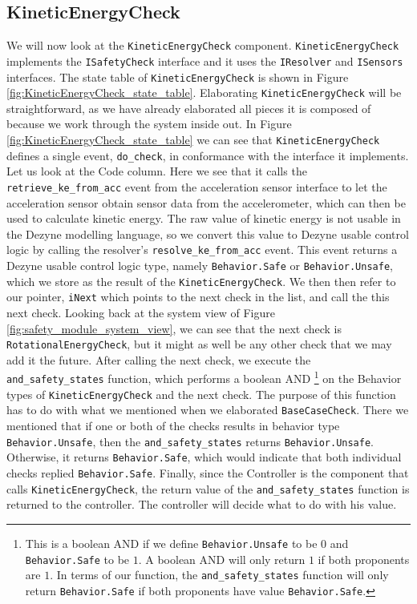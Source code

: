 \documentclass[12pt]{scrreprt}
\begin{document}
\subsection{KineticEnergyCheck}
We will now look at the \texttt{KineticEnergyCheck} component. \texttt{KineticEnergyCheck} implements the \texttt{ISafetyCheck} interface and it uses the \texttt{IResolver} and \texttt{ISensors} interfaces. The state table of \texttt{KineticEnergyCheck} is shown in Figure \ref{fig:KineticEnergyCheck_state_table}. Elaborating \texttt{KineticEnergyCheck} will be straightforward, as we have already elaborated all pieces it is composed of because we work through the system inside out. In Figure \ref{fig:KineticEnergyCheck_state_table} we can see that \texttt{KineticEnergyCheck} defines a single event, \texttt{do\_check}, in conformance with the interface it implements. Let us look at the Code column. Here we see that it calls the \texttt{retrieve\_ke\_from\_acc} event from the acceleration sensor interface to let the acceleration sensor obtain sensor data from the accelerometer, which can then be used to calculate kinetic energy. The raw value of kinetic energy is not usable in the Dezyne modelling language, so we convert this value to Dezyne usable control logic by calling the resolver's \texttt{resolve\_ke\_from\_acc} event. This event returns a Dezyne usable control logic type, namely \texttt{Behavior.Safe} or \texttt{Behavior.Unsafe}, which we store as the result of the \texttt{KineticEnergyCheck}. We then then refer to our pointer, \texttt{iNext} which points to the next check in the list, and call the this next check. Looking back at the system view of Figure \ref{fig:safety_module_system_view}, we can see that the next check is \texttt{RotationalEnergyCheck}, but it might as well be any other check that we may add it the future. After calling the next check, we execute the \texttt{and\_safety\_states}  function, which performs a boolean AND \footnote{This is a boolean AND if we define \texttt{Behavior.Unsafe} to be $0$ and \texttt{Behavior.Safe} to be $1$. A boolean AND will only return $1$ if both proponents are $1$. In terms of our function, the \texttt{and\_safety\_states} function will only return \texttt{Behavior.Safe} if both proponents have value \texttt{Behavior.Safe}.} on the Behavior types of \texttt{KineticEnergyCheck} and the next check. The purpose of this function has to do with what we mentioned when we elaborated \texttt{BaseCaseCheck}. There we mentioned that if one or both of the checks results in behavior type \texttt{Behavior.Unsafe}, then the \texttt{and\_safety\_states} returns \texttt{Behavior.Unsafe}. Otherwise, it returns \texttt{Behavior.Safe}, which would indicate that both individual checks replied \texttt{Behavior.Safe}. Finally, since the Controller is the component that calls \texttt{KineticEnergyCheck}, the return value of the \texttt{and\_safety\_states} function is returned to the controller. The controller will decide what to do with his value.
\end{document}

